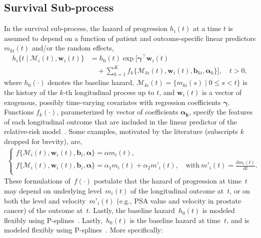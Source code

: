 \subsection{Survival Sub-process}
\label{c4:subsec:surival_sub_model}
In the survival sub-process, the hazard of progression $h_i(t)$ at a time $t$ is assumed to depend on a function of patient and outcome-specific linear predictors $m_{ki}(t)$ and/or the random effects,
\begin{equation*}
\label{c4:eq:rel_risk_model}
\begin{split}
h_i\big\{t \mid \mathcal{M}_i(t), \boldsymbol{w}_i(t)\big\} &= h_0(t) \exp\Big[\boldsymbol{\gamma}^{\top}\boldsymbol{w}_i(t)\\ & \quad + \sum_{k=1}^{K} f_{k} \big\{ \mathcal{M}_{ki}(t), \boldsymbol{w}_i(t), \boldsymbol{b}_{ki}, \boldsymbol{\alpha}_{k} \big\}\Big], \quad t>0,
\end{split}
\end{equation*}
where $h_0(\cdot)$ denotes the baseline hazard, $\mathcal{M}_{ki}(t)=\{m_{ki}(s) \mid 0 \leq s < t \}$ is the history of the ${k\mbox{-th}}$ longitudinal process up to $t$, and $\boldsymbol{w}_i(t)$ is a vector of exogenous, possibly time-varying covariates with regression coefficients $\boldsymbol{\gamma}$. Functions $f_{k}(\cdot)$, parameterized by vector of coefficients $\boldsymbol{\alpha_{k}}$, specify the features of each longitudinal outcome that are included in the linear predictor of the relative-risk model~\citep{brown2009assessing,rizopoulos2012joint,taylor2013real}. Some examples, motivated by the literature (subscripts $k$ dropped for brevity), are,
\begin{eqnarray*}
\left \{
\begin{array}{l}
f\big\{\mathcal{M}_{i}(t), \boldsymbol{w}_i(t), \boldsymbol{b}_{i}, \boldsymbol{\alpha} \big\} = \alpha m_{i}(t),\\
f\big\{ \mathcal{M}_{i}(t), \boldsymbol{w}_i(t), \boldsymbol{b}_{i}, \boldsymbol{\alpha}\big\} = \alpha_1 m_{i}(t) + \alpha_2 m'_{i}(t),\quad \text{with}\  m'_{i}(t) = \frac{\mathrm{d}{m_{i}(t)}}{\mathrm{d}{t}}.\\
\end{array}
\right.
\end{eqnarray*}
These formulations of~$f(\cdot)$ postulate that the hazard of progression at time~$t$ may depend on underlying level~$m_i(t)$ of the longitudinal outcome at~$t$, or on both the level and velocity~$m'_i(t)$ (e.g., PSA value and velocity in prostate cancer) of the outcome at~$t$. Lastly, the baseline hazard~$h_0(t)$ is modeled flexibly using P-splines~\citep{eilers1996flexible}. Lastly,~$h_0(t)$ is the baseline hazard at time~$t$, and is modeled flexibly using P-splines~\citep{eilers1996flexible}. More specifically:
